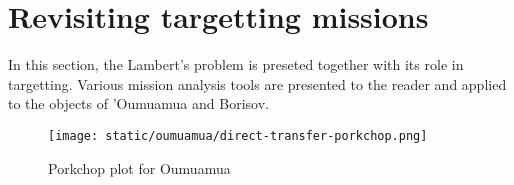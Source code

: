 \chapter{Revisiting targetting missions}

In this section, the Lambert's problem is preseted together with its role in
targetting. Various mission analysis tools are presented to the reader and
applied to the objects of 'Oumuamua and Borisov.





\newpage
\begin{figure}[H]
  \centering
  \texttt{[image: static/oumuamua/direct-transfer-porkchop.png]}
  \caption{Porkchop plot for Oumuamua}
  \label{fig:porkchop}
\end{figure}
